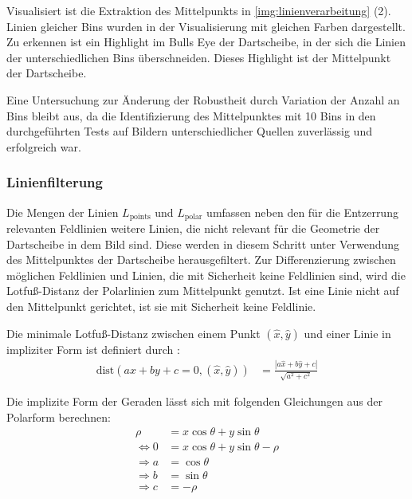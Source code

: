 Visualisiert ist die Extraktion des Mittelpunkts in \autoref{img:linienverarbeitung} (2). Linien gleicher Bins wurden in der Visualisierung mit gleichen Farben dargestellt. Zu erkennen ist ein Highlight im Bulls Eye der Dartscheibe, in der sich die Linien der unterschiedlichen Bins überschneiden. Dieses Highlight ist der Mittelpunkt der Dartscheibe.

Eine Untersuchung zur Änderung der Robustheit durch Variation der Anzahl an Bins bleibt aus, da die Identifizierung des Mittelpunktes mit 10 Bins in den durchgeführten Tests auf Bildern unterschiedlicher Quellen zuverlässig und erfolgreich war.

\subsubsection{Linienfilterung}
\label{sec:linienfilterung}

Die Mengen der Linien $L_\text{points}$ und $L_\text{polar}$ umfassen neben den für die Entzerrung relevanten Feldlinien weitere Linien, die nicht relevant für die Geometrie der Dartscheibe in dem Bild sind. Diese werden in diesem Schritt unter Verwendung des Mittelpunktes der Dartscheibe herausgefiltert. Zur Differenzierung zwischen möglichen Feldlinien und Linien, die mit Sicherheit keine Feldlinien sind, wird die Lotfuß-Distanz der Polarlinien zum Mittelpunkt genutzt. Ist eine Linie nicht auf den Mittelpunkt gerichtet, ist sie mit Sicherheit keine Feldlinie.

Die minimale Lotfuß-Distanz zwischen einem Punkt $(\hat{x}, \hat{y})$ und einer Linie in impliziter Form ist definiert durch \cite{point_line_distance}:
\begin{align*}
    \text{dist}(ax + by + c = 0, (\hat{x}, \hat{y})) & = \frac{| a \hat{x} + b \hat{y} + c|}{\sqrt{a^2+c^2}}
\end{align*}

Die implizite Form der Geraden lässt sich mit folgenden Gleichungen aus der Polarform berechnen:
\begin{align*}
    \rho          & = x \cos{\theta} + y \sin{\theta}        \\
    \iff 0        & = x \cos{\theta} + y \sin{\theta} - \rho \\
    \Rightarrow a & = \cos{\theta}                           \\
    \Rightarrow b & = \sin{\theta}                           \\
    \Rightarrow c & = -\rho
\end{align*}

